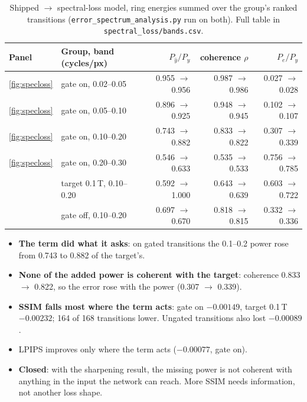 \documentclass[10pt,a4paper]{article}
\begin{document}
\begin{table}[H]
\centering\small
\begin{tabular}{llrrr}
\toprule
Panel & Group, band (cycles/px) & $P_{\hat y}/P_y$ & coherence $\rho$ & $P_e/P_y$ \\
\midrule
\ref{fig:specloss} & gate on, 0.02--0.05 & 0.955 $\to$ 0.956 & 0.987 $\to$ 0.986 & 0.027 $\to$ 0.028 \\
\ref{fig:specloss} & gate on, 0.05--0.10 & 0.896 $\to$ 0.925 & 0.948 $\to$ 0.945 & 0.102 $\to$ 0.107 \\
\ref{fig:specloss} & gate on, 0.10--0.20 & 0.743 $\to$ 0.882 & 0.833 $\to$ 0.822 & 0.307 $\to$ 0.339 \\
\ref{fig:specloss} & gate on, 0.20--0.30 & 0.546 $\to$ 0.633 & 0.535 $\to$ 0.533 & 0.756 $\to$ 0.785 \\
                   & target 0.1\,T, 0.10--0.20 & 0.592 $\to$ 1.000 & 0.643 $\to$ 0.639 & 0.603 $\to$ 0.722 \\
                   & gate off, 0.10--0.20 & 0.697 $\to$ 0.670 & 0.818 $\to$ 0.815 & 0.332 $\to$ 0.336 \\
\bottomrule
\end{tabular}
\caption{Shipped $\to$ spectral-loss model, ring energies summed over the group's ranked
transitions (\texttt{error\_spectrum\_analysis.py} run on both). Full table in
\texttt{spectral\_loss/bands.csv}.}
\label{tab:specbands}
\end{table}

\begin{itemize}
  \item \textbf{The term did what it asks}: on gated transitions the 0.1--0.2 power rose from 0.743
        to 0.882 of the target's.
  \item \textbf{None of the added power is coherent with the target}: coherence 0.833 $\to$ 0.822,
        so the error rose with the power (0.307 $\to$ 0.339).
  \item \textbf{SSIM falls most where the term acts}: gate on $-0.00149$, target 0.1\,T $-0.00232$;
        164 of 168 transitions lower. Ungated transitions also lost $-0.00089$.
  \item LPIPS improves only where the term acts ($-0.00077$, gate on).
  \item \textbf{Closed}: with the sharpening result, the missing power is not coherent with
        anything in the input the network can reach. More SSIM needs information, not another
        loss shape.
\end{itemize}
\end{document}
